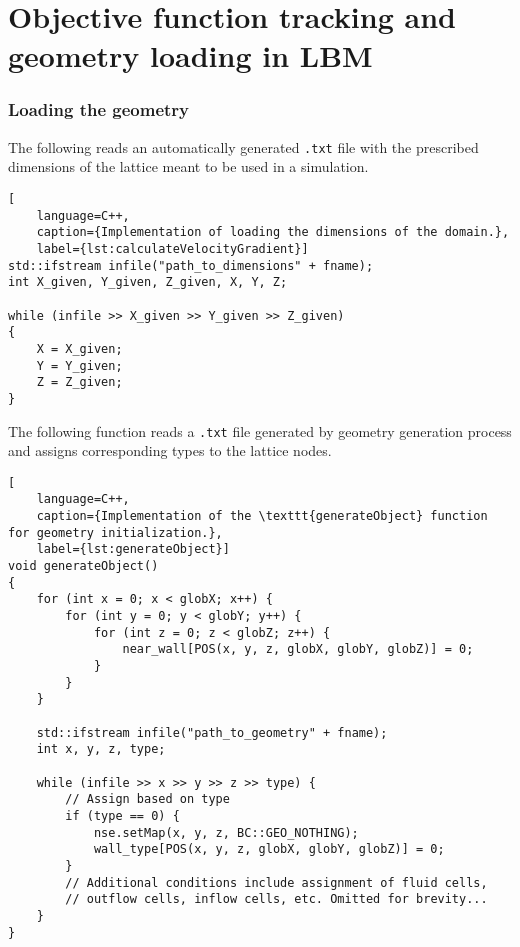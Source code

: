 \chapter{Objective function tracking and geometry loading in LBM}\label{appendix A}

\subsection*{Loading the geometry}
The following reads an automatically generated \texttt{.txt} file with the prescribed dimensions of the lattice meant to be used in a simulation.
\begin{lstlisting}[
	language=C++,
	caption={Implementation of loading the dimensions of the domain.},
	label={lst:calculateVelocityGradient}]
std::ifstream infile("path_to_dimensions" + fname);
int X_given, Y_given, Z_given, X, Y, Z;

while (infile >> X_given >> Y_given >> Z_given)
{
	X = X_given;
	Y = Y_given;
	Z = Z_given;
}
\end{lstlisting}

The following function reads a \texttt{.txt} file generated by geometry generation process and assigns corresponding types to the lattice nodes.

\begin{lstlisting}[
	language=C++,
	caption={Implementation of the \texttt{generateObject} function for geometry initialization.},
	label={lst:generateObject}]
void generateObject()
{
	for (int x = 0; x < globX; x++) {
		for (int y = 0; y < globY; y++) {
			for (int z = 0; z < globZ; z++) {
				near_wall[POS(x, y, z, globX, globY, globZ)] = 0;
			}
		}
	}
	
	std::ifstream infile("path_to_geometry" + fname);
	int x, y, z, type;
	
	while (infile >> x >> y >> z >> type) {
		// Assign based on type
		if (type == 0) {
			nse.setMap(x, y, z, BC::GEO_NOTHING);
			wall_type[POS(x, y, z, globX, globY, globZ)] = 0;
		}
		// Additional conditions include assignment of fluid cells,
		// outflow cells, inflow cells, etc. Omitted for brevity...
	}
}
\end{lstlisting}


